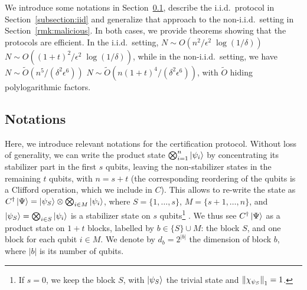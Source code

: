 \documentclass[a4paper,twocolumn,11pt,unpublished]{../../revision/quantumarticle}
\providecommand{\DIFadd}[1]{{\protect\color{blue} \sf #1}} %
\providecommand{\DIFdel}[1]{{\protect\color{red} \scriptsize #1}} %
\providecommand{\DIFaddbegin}{} %
\providecommand{\DIFaddend}{} %
\providecommand{\DIFdelbegin}{} %
\providecommand{\DIFdelend}{} %
\begin{document}
We introduce some notations in Section\ \ref{subsection:notations}, describe the i.i.d.\ protocol in Section\ \ref{subsection:iid} and generalize that approach to the non-i.i.d.\ setting in Section\ \ref{rmk:malicious}. In both cases, we provide theorems showing that the protocols are efficient. In the i.i.d.\ setting, \DIFdelbegin \DIFdel{$N \sim O(n^2/\epsilon^2 \; \log(1/\delta))$}\DIFdelend \DIFaddbegin \DIFadd{$N \sim O((1+t)^2/\epsilon^2 \; \log(1/\delta))$}\DIFaddend , while in the non-i.i.d.\ setting, we have \DIFdelbegin \DIFdel{$N\sim \tilde O(n^5/(\delta^2\epsilon^6))$}\DIFdelend \DIFaddbegin \DIFadd{$N\sim \tilde O(n(1+t)^4/(\delta^2\epsilon^6))$}\DIFaddend , with $\tilde O$ hiding polylogarithmic factors.


\subsection{Notations}
\label{subsection:notations}
\DIFdelbegin \DIFdel{Here, we introduce relevant notations for the certification protocol.
}\DIFdelend \DIFaddbegin \DIFadd{Without loss of generality, we can write the product state $\bigotimes_{i=1}^n\ket{\psi_i}$ by concentrating its stabilizer part in the first $s$ qubits, leaving the non-stabilizer states in the remaining $t$ qubits, with $n=s+t$ (the corresponding reordering of the qubits is a Clifford operation, which we include in $C$).
            This allows to re-write the state as $C^\dagger\ket\Psi=\ket{\psi_S}\otimes\bigotimes_{i\in M}\ket{\psi_i}$, where $S=\{1,\dots,s\}$, $M=\{s+1,\dots,n\}$, and $\ket{\psi_S}=\bigotimes_{i\in S}\ket{\psi_i}$ is a stabilizer state on $s$ qubits}\footnote{\DIFadd{If $s=0$, we keep the block $S$, with $\ket{\psi_S}$ the trivial state and $\left\lVert\chi_{\psi_S}\right\rVert_1=1$.}}\DIFadd{. We thus see $C^\dagger\ket\Psi$ as a product state on $1+t$ blocks, labelled by $b\in\{S\}\cup M$: the block $S$, and one block for each qubit $i\in M$. We denote by $d_b=2^{|b|}$ the dimension of block $b$, where $|b|$ is its number of qubits.
}
\end{document}
